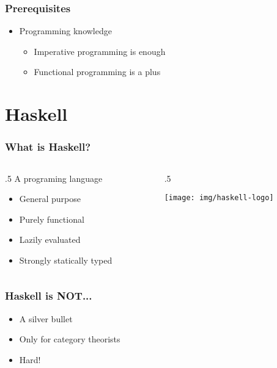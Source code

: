 \documentclass[17pt]{beamer}
\renewcommand{\(}[1]{\begin{columns}[#1]}
\renewcommand{\)}{\end{columns}}
\newcommand{\<}[1]{\begin{column}{#1}}
\renewcommand{\>}{\end{column}}
\begin{document}
\begin{frame}
  \frametitle{Prerequisites}
  \begin{center}
    \begin{itemize}
      \item Programming knowledge
        \begin{itemize}
          \item Imperative programming is enough
          \item Functional programming is a plus
        \end{itemize}
    \end{itemize}
  \end{center}
\end{frame}


\section{Haskell}

\begin{frame}
  \frametitle{What is Haskell?}
  \({c}
  \<{.5\textwidth}
  A programing language
  \begin{center}
    \begin{itemize}[<+->]
    \item General purpose
    \item Purely functional
    \item Lazily evaluated
    \item Strongly statically typed
    \end{itemize}
  \end{center}
  \>
  \<{.5\textwidth}
  \begin{center}
    \texttt{[image: img/haskell-logo]}
  \end{center}
  \>
  \)
\end{frame}

\begin{frame}
  \frametitle{Haskell is NOT...}
  \begin{center}
    \begin{itemize}
    \item A silver bullet
    \item Only for category theorists
    \item<2-> Hard! 
    \end{itemize}
  \end{center}
\end{frame}
\end{document}
